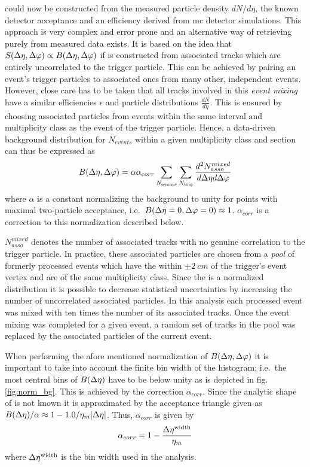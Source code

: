 \B could now be constructed from the measured particle density $dN/d\eta$, the known detector acceptance and an efficiency derived from \gls{mc} detector simulations. This approach is very complex and error prone and an alternative way of retrieving \B purely from measured data exists. It is based on the idea that $S(\Delta\eta, \Delta\varphi) \propto B(\Delta\eta, \Delta\varphi)$ if \Sig is constructed from associated tracks which are entirely uncorrelated to the trigger particle. This can be achieved by pairing an event's trigger particles to associated ones from many other, independent events. However, close care has to be taken that all tracks involved in this \emph{event mixing} have a similar efficiencies $\epsilon$ and particle distributions $\frac{dN}{d\eta}$. This is ensured by choosing associated particles from events within the same \zvtx interval and multiplicity class as the event of the trigger particle.
Hence, a data-driven background distribution for $N_{events}$ within a given multiplicity class and \zvtx section can thus be expressed as
\begin{equation}
  \label{eq:background_datadriven}
  B(\Delta\eta, \Delta\varphi) = \alpha \alpha_{corr}
  \sum_{N_{\text{events}}} 
  \sum_{N_{\text{trig}}}
  \frac{d^2N_{asso}^{mixed}}{d\Delta\eta d\Delta\varphi}
\end{equation}
where $\alpha$ is a constant normalizing the background to unity for points with maximal two-particle acceptance, i.e.\  $B(\Delta\eta = 0, \Delta\varphi=0) \approx 1$. $\alpha_{corr}$ is a correction to this normalization described below.

$N_{asso}^{mixed}$ denotes the number of associated tracks with no genuine correlation to the trigger particle. In practice, these associated particles are chosen from a \emph{pool} of formerly processed events which have the \zvtx within $\pm \SI{2}{cm}$ of the trigger's event vertex and are of the same multiplicity class. Since the \B is a normalized distribution it is possible to decrease statistical uncertainties by increasing the number of uncorrelated associated particles. In this analysis each processed event was mixed with ten times the number of its associated tracks. Once the event mixing was completed for a given event, a random set of tracks in the pool was replaced by the associated particles of the current event.

When performing the afore mentioned normalization of  $B(\Delta\eta, \Delta\varphi)$ it is important to take into account the finite bin width of the histogram; i.e.\ the most central bins of $B(\Delta\eta)$ have to be below unity as is depicted in fig. \ref{fig:norm_bg}. This is achieved by the correction $\alpha_{corr}$. Since the analytic shape of \B is not known it is approximated by the acceptance triangle given as $B(\Delta\eta) / \alpha \approx 1-1.0/\eta_m|\Delta\eta|$. Thus, $\alpha_{corr}$ is given by
\begin{equation}
  \label{eq:alpha}
  \alpha_{corr} = 1- \frac{\Delta\eta^{\text{width}}}{\eta_m}
\end{equation}
where $\Delta\eta^{\text{width}}$ is the \deta bin width used in the analysis.


